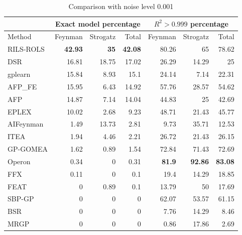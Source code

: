 \documentclass[a4paper,12pt]{elsarticle}
\begin{document}
\begin{table}[!htb]
	\caption{Comparison with noise level 0.001}\label{tab:comp_noise0001}
	\centering
		\begin{tabular}{l|rrr|rrr} \hline
			& \multicolumn{3}{c|}{Exact model percentage} & \multicolumn{3}{c}{$R^2 > 0.999$ percentage}\\ \hline
			Method & Feynman & Strogatz & Total & Feynman & Strogatz & Total \\ \hline
			RILS-ROLS&\bf{42.93}&\bf{35}&\bf{42.08}&80.26&65&78.62\\
			DSR&16.81&18.75&17.02&26.29&14.29&25\\
			gplearn&15.84&8.93&15.1&24.14&7.14&22.31\\
			AFP\_FE&15.95&6.43&14.92&57.76&28.57&54.62\\
			AFP&14.87&7.14&14.04&44.83&25&42.69\\
			EPLEX&10.02&2.68&9.23&48.71&21.43&45.77\\
			AIFeynman&1.49&13.73&2.81&9.73&35.71&12.53\\
			ITEA&1.94&4.46&2.21&26.72&21.43&26.15\\
			GP-GOMEA&1.62&0.89&1.54&72.84&71.43&72.69\\
			Operon&0.34&0&0.31&\bf{81.9}&\bf{92.86}&\bf{83.08}\\
			FFX&0.11&0&0.1&19.4&14.29&18.85\\
			FEAT&0&0.89&0.1&13.79&50&17.69\\
			SBP-GP&0&0&0&62.07&53.57&61.15\\
			BSR&0&0&0&7.76&14.29&8.46\\
			MRGP&0&0&0&0.86&17.86&2.69\\
			\hline
		\end{tabular}
\end{table}
\end{document}
